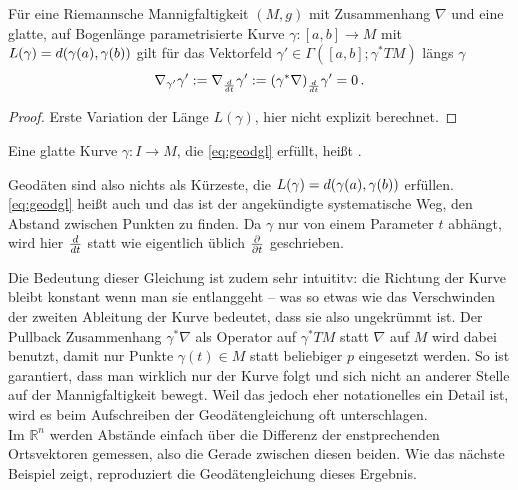 \documentclass[../H_Analysis_main.tex]{subfiles}
\begin{document}
\begin{satz}
Für eine Riemannsche Mannigfaltigkeit $(M, g)$ mit Zusammenhang $\nabla$ und eine glatte, auf Bogenlänge parametrisierte Kurve $\gamma: [a, b] \rightarrow M$ mit $L(\gamma) = d\qty(\gamma(a), \gamma(b))$ gilt für das Vektorfeld $\gamma' \in \Gamma([a, b]; \gamma^* TM)$ längs $\gamma$
\begin{equation}\label{eq:geodgl}
\nabla_{\gamma'} \gamma' := \nabla_{\dv{t}} \gamma' := \qty(\gamma^* \nabla)_{\dv{t}} \gamma' = 0 \, .
\end{equation}
\end{satz}

\begin{proof}
Erste Variation der Länge $L(\gamma)$, hier nicht explizit berechnet.
\end{proof}

\begin{defi}[Geodäte]
Eine glatte Kurve $\gamma: I \rightarrow M$, die \eqref{eq:geodgl} erfüllt, heißt .
\end{defi}

Geodäten sind also nichts als Kürzeste, die $L(\gamma) = d\qty(\gamma(a), \gamma(b))$ erfüllen. \eqref{eq:geodgl} heißt auch  und das ist der angekündigte systematische Weg, den Abstand zwischen Punkten zu finden. Da $\gamma$ nur von einem Parameter $t$ abhängt, wird hier $\dv{t}$ statt wie eigentlich üblich $\pdv{t}$ geschrieben.

Die Bedeutung dieser Gleichung ist zudem sehr intuititv: die Richtung der Kurve bleibt konstant wenn man sie entlanggeht -- was so etwas wie das Verschwinden der zweiten Ableitung der Kurve bedeutet, dass sie also ungekrümmt ist. Der Pullback Zusammenhang $\gamma^*\nabla$ als Operator auf $\gamma^* TM$ statt $\nabla$ auf $M$ wird dabei benutzt, damit nur Punkte $\gamma(t) \in M$ statt beliebiger $p$ eingesetzt werden. So ist garantiert, dass man wirklich nur der Kurve folgt und sich nicht an anderer Stelle auf der Mannigfaltigkeit bewegt. Weil das jedoch eher notationelles ein Detail ist, wird es beim Aufschreiben der Geodätengleichung oft unterschlagen.\\


Im $\mathbb{R}^n$ werden Abstände einfach über die Differenz der enstprechenden Ortsvektoren gemessen, also die Gerade zwischen diesen beiden. Wie das nächste Beispiel zeigt, reproduziert die Geodätengleichung dieses Ergebnis.
\end{document}
